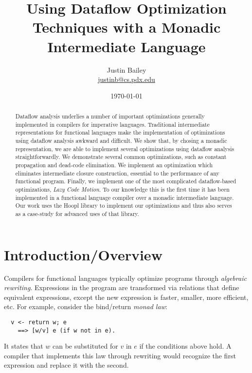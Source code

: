 \documentclass[11pt]{article}
\title{Using Dataflow Optimization Techniques with a Monadic Intermediate Language}
\author{Justin Bailey \\ \url{justinb@cs.pdx.edu}}
\date{\today}
\begin{document}
\VerbatimFootnotes
\DefineShortVerb{\#}
\doublespacing

\maketitle

\begin{abstract}
  Dataflow analysis underlies a number of important optimizations
  generally implemented in compilers for imperative
  languages. Traditional intermediate representations for functional
  languages make the implementation of optimizations using dataflow
  analysis awkward and difficult. We show that, by chosing a monadic
  representation, we are able to implement several optimizations using
  dataflow analysis straightforwardly. We demonstrate several common
  optimizations, such as constant propagation and dead-code
  elimination. We implement an optimization which eliminates
  intermediate closure construction, essential to the performance of
  any functional program. Finally, we implement one of the most
  complicated dataflow-based optimizations, \emph{Lazy Code
    Motion}. To our knowledge this is the first time it has been
  implemented in a functional language compiler over a monadic
  intermediate language. Our work uses the Hoopl library to implement
  our optimizations and thus also serves as a case-study
  for advanced uses of that library.
\end{abstract}

\section{Introduction/Overview}

Compilers for functional languages typically 
optimize programs through \emph{algebraic rewriting}. Expressions in
the program are transformed via relations that define equivalent
expressions, except the new expression is faster, smaller, more
efficient, etc. For example, consider the bind/return \emph{monad law}:

\begin{verbatim}
  v <- return w; e 
    ==> [w/v] e (if w not in e).
\end{verbatim}

It states that $w$ can be substituted for $v$ in $e$ if the conditions
above hold. A compiler that implements this law through rewriting would
recognize the first expression and replace it with the second.
\end{document}
